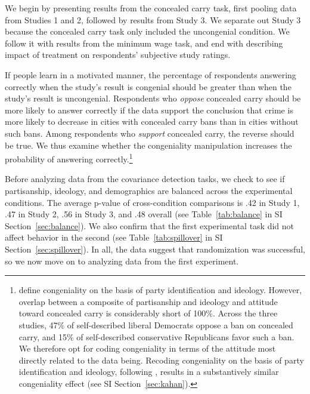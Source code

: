 \documentclass[12pt, letterpaper]{article}
\begin{document}
We begin by presenting results from the concealed carry task, first pooling data from Studies 1 and 2, followed by results from Study 3. We separate out Study 3 because the concealed carry task only included the uncongenial condition. We follow it with results from the minimum wage task, and end with describing impact of treatment on respondents' subjective study ratings.

If people learn in a motivated manner, the percentage of respondents answering correctly when the study's result is congenial should be greater than when the study's result is uncongenial. Respondents who {\it oppose} concealed carry should be more likely to answer correctly if the data support the conclusion that crime is more likely to decrease in cities with concealed carry bans than in cities without such bans. Among respondents who {\it support} concealed carry, the reverse should be true. We thus examine whether the congeniality manipulation increases the probability of answering correctly.\footnote{\citet{kahan2017} define congeniality on the basis of party identification and ideology. However, overlap between a composite of partisanship and ideology and attitude toward concealed carry is considerably short of 100\%. Across the three studies, 47\% of self-described liberal Democrats oppose a ban on concealed carry, and 15\% of self-described conservative Republicans favor such a ban. We therefore opt for coding congeniality in terms of the attitude most directly related to the data being. Recoding congeniality on the basis of party identification and ideology, following \citeauthor{kahan2017}, results in a substantively similar congeniality effect (see SI Section~\ref{sec:kahan}).}

Before analyzing data from the covariance detection tasks, we check to see if partisanship, ideology, and demographics are balanced across the experimental conditions. The average p-value of cross-condition comparisons is .42 in Study 1, .47 in Study 2, .56 in Study 3, and .48 overall (see Table~\ref{tab:balance} in SI Section~\ref{sec:balance}). We also confirm that the first experimental task did not affect behavior in the second (see Table~\ref{tab:spillover} in SI Section~\ref{sec:spillover}). In all, the data suggest that randomization was successful, so we now move on to analyzing data from the first experiment.
 
\end{document}
